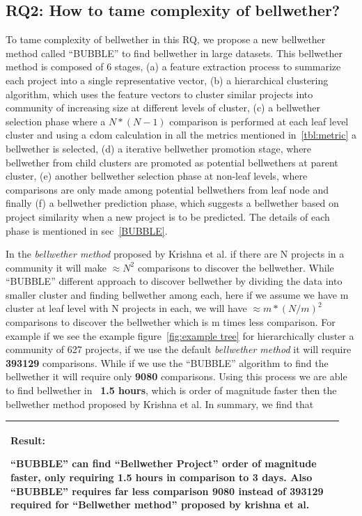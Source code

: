 \documentclass[10pt,journal,compsoc]{IEEEtran}
\newenvironment{result}
{\vspace{0.15cm}
\noindent\begin{minipage}{\linewidth}
\begin{center}
\arrayrulecolor{lightergray}
\begin{tabular}{|p{0.95\linewidth}|}
\hline%
\rowcolor{lightergray}%
\textbf{Result:}~%
}
{\\\hline
\end{tabular}
\end{center}
\end{minipage}
\vspace{0.15cm}
}
\begin{document}
\subsection*{RQ2: How to tame complexity of bellwether?}
\label{sec:rq2}

To tame complexity of bellwether in this RQ, we propose a new bellwether method called ``BUBBLE'' to find bellwether in large datasets. This bellwether method is composed of 6 stages, (a) a feature extraction process to summarize each project into a single representative vector, (b) a hierarchical clustering algorithm, which uses the feature vectors to cluster similar projects into community of increasing size at different levels of cluster, (c) a bellwether selection phase where a $N*(N-1)$ comparison is performed at each leaf level cluster and using a cdom calculation in all the metrics mentioned in~\ref{tbl:metric} a bellwether is selected, (d) a iterative bellwether promotion stage, where bellwether from child clusters are promoted as potential bellwethers at parent cluster, (e) another bellwether selection phase at non-leaf levels, where comparisons are only made among potential bellwethers from leaf node and finally (f) a bellwether prediction phase, which suggests a bellwether based on project similarity when a new project is to be predicted. The details of each phase is mentioned in sec~\ref{BUBBLE}. 

In the \textit{bellwether method} proposed by Krishna et al. if there are N projects in a community it will make $\approx N^2$ comparisons to discover the bellwether. While ``BUBBLE'' different approach to discover bellwether by dividing the data into smaller cluster and finding bellwether among each, here if we assume we have m cluster at leaf level with N projects in each, we will have 
$\approx m*(N/m)^2$ comparisons to discover the bellwether which is m times less comparison. For example if we see the example figure~\ref{fig:example tree} for hierarchically cluster a community of 627 projects, if we use the default \textit{bellwether method} it will require \textbf{393129} comparisons. While if we use the ``BUBBLE'' algorithm to find the bellwether it will require only \textbf{9080} comparisons. Using this process we are able to find bellwether in ~\textbf{1.5 hours}, which is order of magnitude faster then the bellwether method proposed by Krishna et al. In summary, we find that

\begin{result}
{``BUBBLE'' can find ``Bellwether Project'' order of magnitude faster, only requiring 1.5 hours in comparison to 3 days. Also ``BUBBLE'' requires far less comparison 9080 instead of 393129 required for ``Bellwether method'' proposed by krishna et al. }
\end{result}
\end{document}
